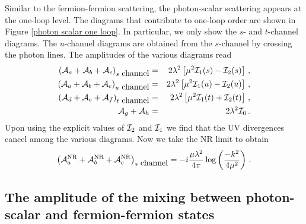 \documentclass[11pt]{article}
\begin{document}
Similar to the fermion-fermion scattering, the photon-scalar scattering appears at the one-loop level. The diagrams that contribute to one-loop order are shown in Figure \ref{photon scalar one loop}. In particular, we only show the $s$- and $t$-channel diagrams. The $u$-channel diagrams are obtained from the $s$-channel by crossing the photon lines.  The amplitudes of the various diagrams read
%
\begin{eqnarray}
\nonumber
\left({\cal A}_a+{\cal A}_b+{\cal A}_c\right)_{s~\mbox{channel}}&=&2\lambda^2 \left[\mu^2 {\cal I}_1(s)-{\cal I}_2(s) \right]\,,\\
\nonumber
\left({\cal A}_a+{\cal A}_b+{\cal A}_c\right)_{u~\mbox{channel}}&=&2\lambda^2 \left[\mu^2 {\cal I}_1(u)-{\cal I}_2(u) \right]\,,\\
\nonumber
\left({\cal A}_d+{\cal A}_e+{\cal A}_f\right)_{t~\mbox{channel}}&=&2\lambda^2 \left[\mu^2 {\cal I}_1(t)+{\cal I}_2(t) \right]\,,\\
{\cal A}_g+{\cal A}_h&=&2\lambda^2 {\cal I}_0\,.
\end{eqnarray}
%
Upon using the explicit values of ${\cal I}_2$ and ${\cal I}_1$ we find that the UV divergences cancel among the various diagrams. Now we take the NR limit to obtain
%
\begin{eqnarray}
\left({\cal A}^{\scriptsize\mbox{NR}}_a+{\cal A}^{\scriptsize\mbox{NR}}_b+{\cal A}^{\scriptsize\mbox{NR}}_c\right)_{s~\mbox{channel}}=-i\frac{\mu\lambda^2}{4\pi}\log\left(\frac{-k^2}{4\mu^2}\right)\,.
\label{photon scalar amplitude}
\end{eqnarray}
%





\subsection*{The amplitude of the mixing between photon-scalar and fermion-fermion states }
\end{document}
